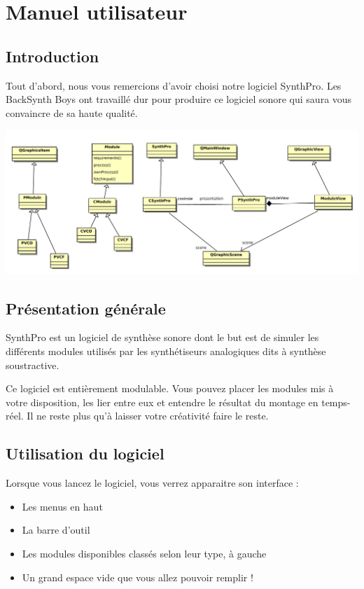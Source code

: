 \documentclass[a4paper,oneside,frenchb,12pt]{article}
\begin{document}
\section{Manuel utilisateur}

\subsection{Introduction}

Tout d'abord, nous vous remercions d'avoir choisi notre logiciel
SynthPro. Les BackSynth Boys ont travaillé dur pour produire ce
logiciel sonore qui saura vous convaincre de sa haute qualité.

\includegraphics[width=18cm]{../img/pac.pdf}


\subsection{Présentation générale}

SynthPro est un logiciel de synthèse sonore dont le but est de
simuler les différents modules utilisés par les synthétiseurs
analogiques dits à synthèse soustractive.

Ce logiciel est entièrement modulable. Vous pouvez placer les
modules mis à votre disposition, les lier entre eux et entendre le
résultat du montage en temps-réel. Il ne reste plus qu'à laisser
votre créativité faire le reste.

\subsection{Utilisation du logiciel}

Lorsque vous lancez le logiciel, vous verrez apparaitre son
interface :

\begin{itemize}
\item
  Les menus en haut
\item
  La barre d'outil
\item
  Les modules disponibles classés selon leur type, à gauche
\item
  Un grand espace vide que vous allez pouvoir remplir !
\end{itemize}
\end{document}
